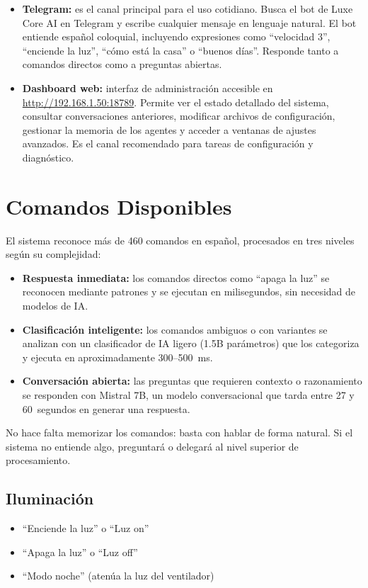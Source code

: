 \begin{itemize}
    \item \textbf{Telegram:} es el canal principal para el uso cotidiano. Busca el bot de Luxe Core AI en Telegram y escribe cualquier mensaje en lenguaje natural. El bot entiende español coloquial, incluyendo expresiones como ``velocidad 3'', ``enciende la luz'', ``cómo está la casa'' o ``buenos días''. Responde tanto a comandos directos como a preguntas abiertas.
    \item \textbf{Dashboard web:} interfaz de administración accesible en \url{http://192.168.1.50:18789}. Permite ver el estado detallado del sistema, consultar conversaciones anteriores, modificar archivos de configuración, gestionar la memoria de los agentes y acceder a ventanas de ajustes avanzados. Es el canal recomendado para tareas de configuración y diagnóstico.
\end{itemize}

\section{Comandos Disponibles}

El sistema reconoce más de 460 comandos en español, procesados en tres niveles según su complejidad:

\begin{itemize}
    \item \textbf{Respuesta inmediata:} los comandos directos como ``apaga la luz'' se reconocen mediante patrones y se ejecutan en milisegundos, sin necesidad de modelos de IA.
    \item \textbf{Clasificación inteligente:} los comandos ambiguos o con variantes se analizan con un clasificador de IA ligero (1.5B parámetros) que los categoriza y ejecuta en aproximadamente 300--500~ms.
    \item \textbf{Conversación abierta:} las preguntas que requieren contexto o razonamiento se responden con Mistral 7B, un modelo conversacional que tarda entre 27 y 60~segundos en generar una respuesta.
\end{itemize}

No hace falta memorizar los comandos: basta con hablar de forma natural. Si el sistema no entiende algo, preguntará o delegará al nivel superior de procesamiento.

\subsection{Iluminación}
\begin{itemize}
    \item ``Enciende la luz'' o ``Luz on''
    \item ``Apaga la luz'' o ``Luz off''
    \item ``Modo noche'' (atenúa la luz del ventilador)
\end{itemize}

